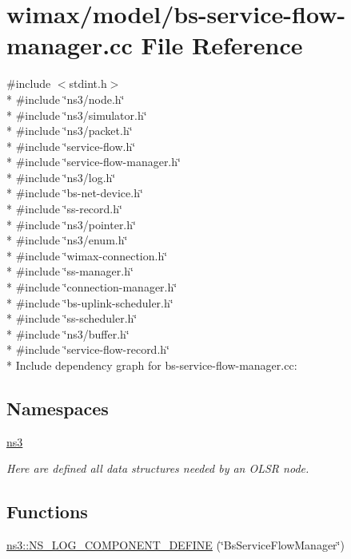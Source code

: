 \hypertarget{bs-service-flow-manager_8cc}{}\section{wimax/model/bs-\/service-\/flow-\/manager.cc File Reference}
\label{bs-service-flow-manager_8cc}
{\ttfamily \#include $<$stdint.\+h$>$}\\*
{\ttfamily \#include \char`\"{}ns3/node.\+h\char`\"{}}\\*
{\ttfamily \#include \char`\"{}ns3/simulator.\+h\char`\"{}}\\*
{\ttfamily \#include \char`\"{}ns3/packet.\+h\char`\"{}}\\*
{\ttfamily \#include \char`\"{}service-\/flow.\+h\char`\"{}}\\*
{\ttfamily \#include \char`\"{}service-\/flow-\/manager.\+h\char`\"{}}\\*
{\ttfamily \#include \char`\"{}ns3/log.\+h\char`\"{}}\\*
{\ttfamily \#include \char`\"{}bs-\/net-\/device.\+h\char`\"{}}\\*
{\ttfamily \#include \char`\"{}ss-\/record.\+h\char`\"{}}\\*
{\ttfamily \#include \char`\"{}ns3/pointer.\+h\char`\"{}}\\*
{\ttfamily \#include \char`\"{}ns3/enum.\+h\char`\"{}}\\*
{\ttfamily \#include \char`\"{}wimax-\/connection.\+h\char`\"{}}\\*
{\ttfamily \#include \char`\"{}ss-\/manager.\+h\char`\"{}}\\*
{\ttfamily \#include \char`\"{}connection-\/manager.\+h\char`\"{}}\\*
{\ttfamily \#include \char`\"{}bs-\/uplink-\/scheduler.\+h\char`\"{}}\\*
{\ttfamily \#include \char`\"{}ss-\/scheduler.\+h\char`\"{}}\\*
{\ttfamily \#include \char`\"{}ns3/buffer.\+h\char`\"{}}\\*
{\ttfamily \#include \char`\"{}service-\/flow-\/record.\+h\char`\"{}}\\*
Include dependency graph for bs-\/service-\/flow-\/manager.cc\+:
\subsection*{Namespaces}
\begin{DoxyCompactItemize}
\item 
 \hyperlink{namespacens3}{ns3}
\begin{DoxyCompactList}\small\item\em Here are defined all data structures needed by an O\+L\+SR node. \end{DoxyCompactList}\end{DoxyCompactItemize}
\subsection*{Functions}
\begin{DoxyCompactItemize}
\item 
\hyperlink{namespacens3_ac7db8aa29919a044b6c6e2543295cd8d}{ns3\+::\+N\+S\+\_\+\+L\+O\+G\+\_\+\+C\+O\+M\+P\+O\+N\+E\+N\+T\+\_\+\+D\+E\+F\+I\+NE} (\char`\"{}Bs\+Service\+Flow\+Manager\char`\"{})
\end{DoxyCompactItemize}
